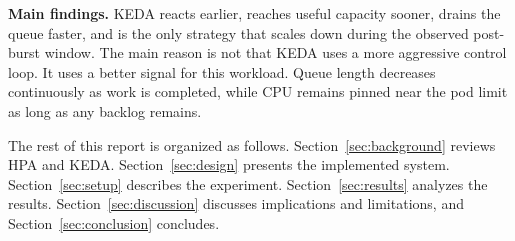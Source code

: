\textbf{Main findings.} KEDA reacts earlier, reaches useful capacity sooner, drains the queue faster, and is the only strategy that scales down during the observed post-burst window. The main reason is not that KEDA uses a more aggressive control loop. It uses a better signal for this workload. Queue length decreases continuously as work is completed, while CPU remains pinned near the pod limit as long as any backlog remains.

The rest of this report is organized as follows. Section~\ref{sec:background} reviews HPA and KEDA. Section~\ref{sec:design} presents the implemented system. Section~\ref{sec:setup} describes the experiment. Section~\ref{sec:results} analyzes the results. Section~\ref{sec:discussion} discusses implications and limitations, and Section~\ref{sec:conclusion} concludes.
